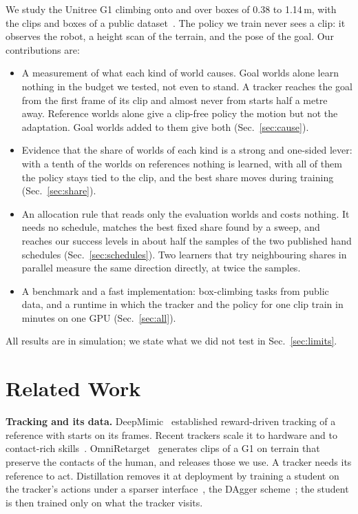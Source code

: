 We study the Unitree G1 climbing onto and over boxes of 0.38 to 1.14\,m, with the clips and boxes of a public dataset~\cite{omniretarget}. The policy we train never sees a clip: it observes the robot, a height scan of the terrain, and the pose of the goal. Our contributions are:
\begin{itemize}
\item A measurement of what each kind of world causes. Goal worlds alone learn nothing in the budget we tested, not even to stand. A tracker reaches the goal from the first frame of its clip and almost never from starts half a metre away. Reference worlds alone give a clip-free policy the motion but not the adaptation. Goal worlds added to them give both (Sec.~\ref{sec:cause}).
\item Evidence that the share of worlds of each kind is a strong and one-sided lever: with a tenth of the worlds on references nothing is learned, with all of them the policy stays tied to the clip, and the best share moves during training (Sec.~\ref{sec:share}).
\item An allocation rule that reads only the evaluation worlds and costs nothing. It needs no schedule, matches the best fixed share found by a sweep, and reaches our success levels in about half the samples of the two published hand schedules (Sec.~\ref{sec:schedules}). Two learners that try neighbouring shares in parallel measure the same direction directly, at twice the samples.
\item A benchmark and a fast implementation: \tasksall{} box-climbing tasks from public data, and a runtime in which the tracker and the policy for one clip train in minutes on one GPU (Sec.~\ref{sec:all}).
\end{itemize}
All results are in simulation; we state what we did not test in Sec.~\ref{sec:limits}.

\section{Related Work}

\textbf{Tracking and its data.} DeepMimic~\cite{deepmimic} established reward-driven tracking of a reference with starts on its frames. Recent trackers scale it to hardware and to contact-rich skills~\cite{beyondmimic,zest}. OmniRetarget~\cite{omniretarget} generates clips of a G1 on terrain that preserve the contacts of the human, and releases those we use. A tracker needs its reference to act. Distillation removes it at deployment by training a student on the tracker's actions under a sparser interface~\cite{maskedmimic,hover}, the DAgger scheme~\cite{dagger}; the student is then trained only on what the tracker visits.

